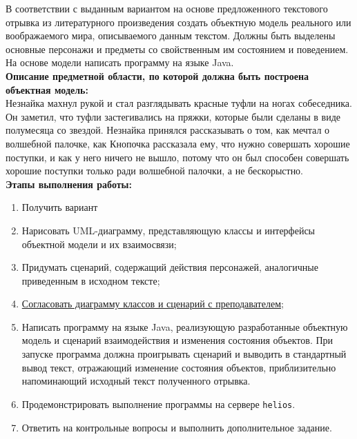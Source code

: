     


    \tableofcontents


    \newpage
    \Chapter{\lab\ \labnumber}{\labtheme}{}


%
    В соответствии с выданным вариантом на основе предложенного текстового отрывка из литературного произведения создать объектную модель реального или воображаемого мира, описываемого данным текстом.
    Должны быть выделены основные персонажи и предметы со свойственным им состоянием и поведением.
    На основе модели написать программу на языке Java.\\
    \textbf{Описание предметной области, по которой должна быть построена объектная модель:}\\
    Незнайка махнул рукой и стал разглядывать красные туфли на ногах собеседника.
    Он заметил, что туфли застегивались на пряжки, которые были сделаны в виде полумесяца со звездой.
    Незнайка принялся рассказывать о том, как мечтал о волшебной палочке, как Кнопочка рассказала ему, что нужно совершать хорошие поступки, и как у него ничего не вышло, потому что он был способен совершать хорошие поступки только ради волшебной палочки, а не бескорыстно.\\
    \textbf{Этапы выполнения работы:}
    \begin{enumerate}
        \item Получить вариант
        \item Нарисовать UML-диаграмму, представляющую классы и интерфейсы объектной модели и их взаимосвязи;
        \item Придумать сценарий, содержащий действия персонажей, аналогичные приведенным в исходном тексте;
        \item \underline{Согласовать диаграмму классов и сценарий с преподавателем;}
        \item Написать программу на языке Java, реализующую разработанные объектную модель и сценарий взаимодействия и изменения состояния объектов.
        При запуске программа должна проигрывать сценарий и выводить в стандартный вывод текст, отражающий изменение состояния объектов, приблизительно напоминающий исходный текст полученного отрывка.
        \item Продемонстрировать выполнение программы на сервере \verb|helios|.
        \item Ответить на контрольные вопросы и выполнить дополнительное задание.
    \end{enumerate}
